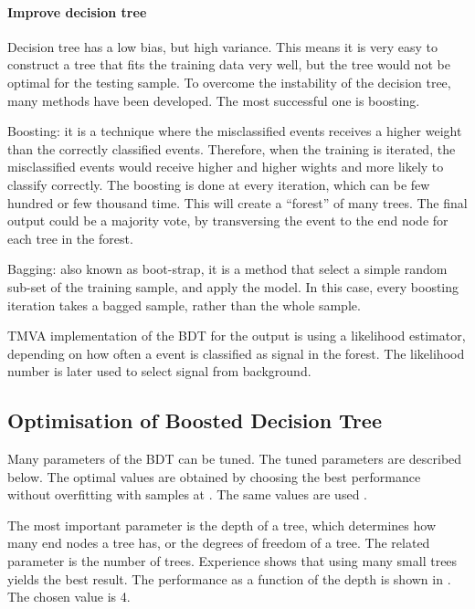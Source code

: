 \paragraph{Improve decision tree}

Decision tree has a low bias, but high variance. This means it is very easy to construct a tree that fits the training data very well, but the tree would not be optimal for the testing sample. To overcome the instability of the decision tree, many methods have been developed. The most successful one is boosting.

Boosting: it is a technique where the misclassified events receives a higher weight than the correctly classified events. Therefore, when the training is iterated, the misclassified events would receive higher and higher wights and more likely to classify correctly. The boosting is done at every iteration, which can be few hundred or few thousand time. This will create a ``forest'' of many trees. The final output could be a majority vote, by transversing the event to the end node for each tree in the forest.

Bagging: also known as boot-strap, it is a method that select a simple random sub-set of the training sample, and apply the model. In this case, every boosting iteration takes a bagged sample, rather than the whole sample.

TMVA implementation of the BDT for the output is using a likelihood estimator, depending on how often a event is classified as signal in the forest. The likelihood number is later used to select signal from background.


\subsection{Optimisation of Boosted Decision Tree}

Many parameters of the BDT can be tuned. The tuned parameters are described below. The optimal values are obtained by choosing the best performance without overfitting with samples at . The same values are used .

The most important parameter is the depth of a tree, which determines how many end nodes a tree has, or the degrees of freedom of a tree. The related parameter is the number of trees. Experience shows that using many small trees yields the best result. The performance as a function of the depth is shown in . The chosen value is 4.

